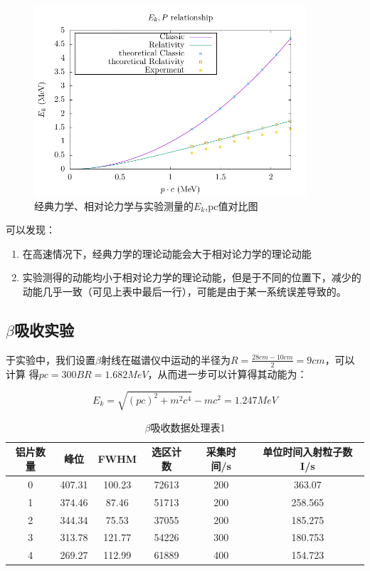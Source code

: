 \documentclass[a4paper,UTF8]{ctexart}
\begin{document}
\begin{figure}[H]
    \centering
    \begin{minipage}[b]{0.9\textwidth}
        \centering
        \includegraphics[width=0.9\textwidth]{./pic.pdf}
        \caption{经典力学、相对论力学与实验测量的$E_{k}$,pc值对比图}
    \end{minipage}
\end{figure}

可以发现：

\begin{enumerate}
    \item 在高速情况下，经典力学的理论动能会大于相对论力学的理论动能
    \item 实验测得的动能均小于相对论力学的理论动能，但是于不同的位置下，减少的动能几乎一致（可见上表中最后一行），可能是由于某一系统误差导致的。
\end{enumerate}

\subsection{$\beta$吸收实验}

于实验中，我们设置$\beta$射线在磁谱仪中运动的半径为$R= \frac{28cm-10cm}{2} = 9 cm$，可以计算
得$pc = 300 B R = 1.682 MeV$，从而进一步可以计算得其动能为：

\begin{equation}
    E_{k} = \sqrt{(pc)^2+m^2c^4}-mc^2 = 1.247 MeV
\end{equation}

\begin{table}[H]
    \centering
    \begin{tabular}{|c|c|c|c|c|c|}
    \hline
        铝片数量 & 峰位 & FWHM & 选区计数 & 采集时间/s & 单位时间入射粒子数I/s \\ \hline
        0 & 407.31 & 100.23 & 72613 & 200 & 363.07 \\ \hline
        1 & 374.46 & 87.46 & 51713 & 200 & 258.565 \\ \hline
        2 & 344.34 & 75.53 & 37055 & 200 & 185.275 \\ \hline
        3 & 313.78 & 121.77 & 54226 & 300 & 180.753 \\ \hline
        4 & 269.27 & 112.99 & 61889 & 400 & 154.723 \\ \hline
    \end{tabular}
    \caption{$\beta$吸收数据处理表1}
\end{table}
\end{document}
